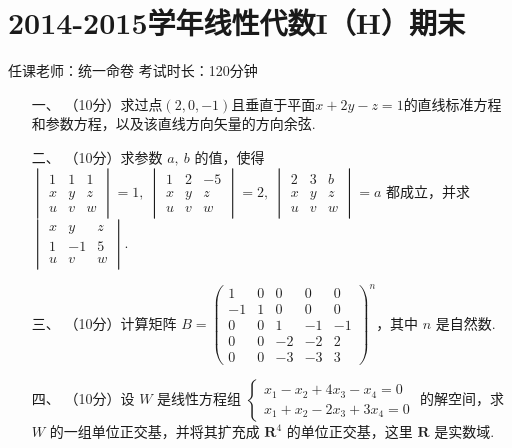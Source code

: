 \section*{2014-2015学年线性代数I（H）期末}

\begin{center}
    任课老师：统一命卷\hspace{4em} 考试时长：120分钟
\end{center}

\begin{enumerate}
	\item[一、]（10分）求过点$(2,0,-1)$且垂直于平面$x+2y-z=1$的直线标准方程和参数方程，以及该直线方向矢量的方向余弦.
	\item[二、]（10分）求参数 $a,\ b$  的值，使得 $\begin{vmatrix}1 & 1 & 1 \\ x & y & z \\u & v & w\end{vmatrix}=1,\ \begin{vmatrix}1 & 2 & -5 \\ x & y & z \\u & v & w\end{vmatrix}=2,\ \begin{vmatrix}2 & 3 & b \\ x & y & z \\u & v & w\end{vmatrix}=a$ 都成立，并求$\begin{vmatrix}x & y & z \\ 1 & -1 & 5 \\u & v & w\end{vmatrix}$.
	\item[三、]（10分）计算矩阵 $B=\begin{pmatrix}1 & 0 & 0 & 0 & 0 \\ -1 & 1 & 0 & 0 & 0 \\ 0 & 0 & 1 & -1 & -1 \\ 0 & 0 & -2 & -2 & 2 \\ 0 & 0 & -3 & -3 & 3\end{pmatrix}^n$，其中 $n$ 是自然数.
	\item[四、]（10分）设 $W$ 是线性方程组 $\begin{cases}
        x_1-x_2+4x_3-x_4=0 \\ x_1+x_2-2x_3+3x_4=0
    \end{cases}$ 的解空间，求 $W$ 的一组单位正交基，并将其扩充成 $\mathbf{R}^4$ 的单位正交基，这里 $\mathbf{R}$ 是实数域.

\end{enumerate}
